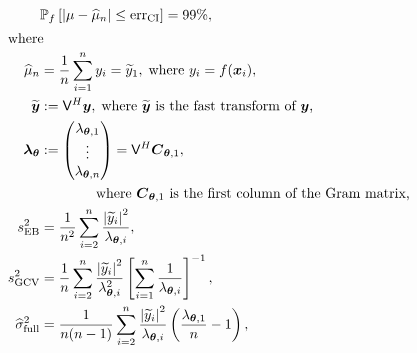 \documentclass[graybox,footinfo]{svmult}
\newcommand{\abs}[1]{\left\lvert #1 \right\rvert} %
\begin{document}
		\begin{align}
			\label{FJ:eqn:CI}
			&\mathbb{P}_f \left[
			|\mu-\widehat{\mu}_n| \leq \textup{err}_{\textup{CI}}
			\right] = 99\%, \\
			\intertext{where}
			\label{FJ:muhatGCV-FB-MLE-Simple}
			\widehat{\mu}_n &= \frac 1n \sum_{i=1}^n y_i = \widetilde{y}_1, \;  \text{where $y_i =f(\bsx_i)$},\\
		\nonumber 
		\widetilde{\bsy} &:= \mathsf{V}^H \bsy, \; \text{where $\widetilde{\bsy}$ is the fast transform of $\bsy$,}  \\
		\nonumber 
		{\bslambda}_\bstheta &:= \begin{pmatrix}
			\lambda_{\bstheta,1} \\ \vdots \\ \lambda_{\bstheta,n} \end{pmatrix} = \mathsf{V}^H \bsC_{\bstheta,1}, \\ & \nonumber \qquad \qquad \text{where $\bsC_{\bstheta,1}$ is the first column of the Gram matrix,} \\
		\nonumber
		s^2_\textup{EB} 
		& =
		\frac{1}{n^2} 
		\sum_{i=2}^n \frac{\abs{\widetilde{y}_i}^2}{\lambda_{\bstheta,i}},  \\
		\nonumber 
		s^2_{\textup{GCV}} & =  \frac 1{n} \sum_{i=2}^n \frac{\abs{\widetilde{y}_i}^2}{\lambda_{\bstheta,i}^2}  \left [ \sum_{i=1}^n \frac{1}{\lambda_{\bstheta,i}} \right]^{-1}, \\
		\nonumber
		\widehat{\sigma}^2_{\textup{full}} &= \frac{1}{n(n-1)} \sum_{i=2}^n \frac{\abs{\widetilde{y}_i}^2}{\lambda_{\bstheta,i}}  \left(\frac{\lambda_{\bstheta,1}}{n}  - 1  \right), 
		\end{align}
\end{document}

